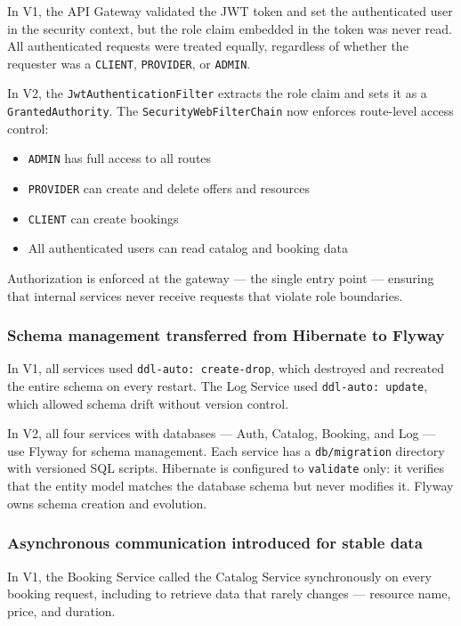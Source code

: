 In V1, the API Gateway validated the JWT token and set the authenticated user in the security context, but the role claim embedded in the token was never read. All authenticated requests were treated equally, regardless of whether the requester was a \texttt{CLIENT}, \texttt{PROVIDER}, or \texttt{ADMIN}.

In V2, the \texttt{JwtAuthenticationFilter} extracts the role claim and sets it as a
\texttt{GrantedAuthority}. The \texttt{SecurityWebFilterChain} now enforces route-level
access control:

\begin{itemize}
    \item \texttt{ADMIN} has full access to all routes
    \item \texttt{PROVIDER} can create and delete offers and resources
    \item \texttt{CLIENT} can create bookings
    \item All authenticated users can read catalog and booking data
\end{itemize}

Authorization is enforced at the gateway --- the single entry point --- ensuring that
internal services never receive requests that violate role boundaries.

\subsubsection{Schema management transferred from Hibernate to Flyway}

In V1, all services used \texttt{ddl-auto: create-drop}, which destroyed and recreated the entire schema on every restart. The Log Service used \texttt{ddl-auto: update}, which allowed schema drift without version control.

In V2, all four services with databases --- Auth, Catalog, Booking, and Log --- use Flyway for schema management. Each service has a \texttt{db/migration} directory with versioned SQL scripts. Hibernate is configured to \texttt{validate} only: it verifies that the entity model matches the database schema but never modifies it. Flyway owns schema creation and evolution.

\subsubsection{Asynchronous communication introduced for stable data}

In V1, the Booking Service called the Catalog Service synchronously on every booking request, including to retrieve data that rarely changes --- resource name, price, and duration.

